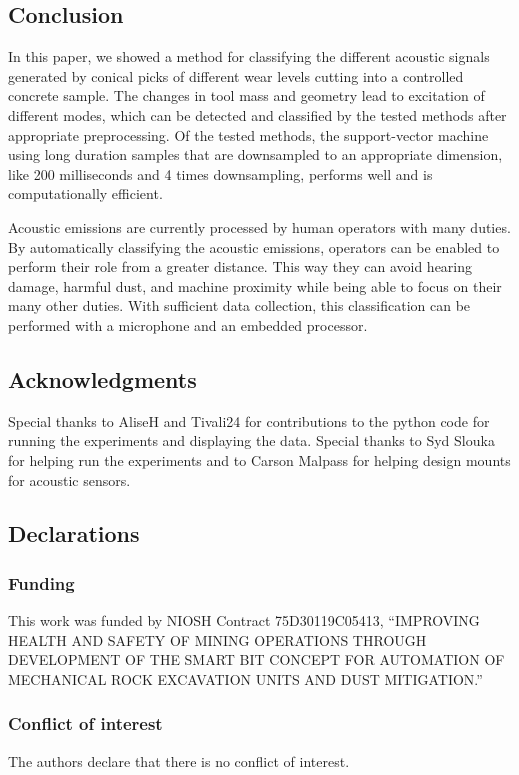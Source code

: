 \subsection{Conclusion}\label{sec13}

In this paper, we showed a method for classifying the different acoustic signals
generated by conical picks of different wear levels cutting into a controlled concrete sample. 
The changes in tool mass and geometry lead to excitation of different modes,
which can be detected and classified by the tested methods after 
appropriate preprocessing. Of the tested methods,
the support-vector machine using long duration samples that are downsampled to an appropriate dimension, 
like 200 milliseconds and 4 times downsampling,
performs well and is computationally efficient.

Acoustic emissions are currently processed by human operators with many duties. 
By automatically classifying the acoustic emissions, operators
can be enabled to perform their role from a greater distance.
This way they can avoid hearing damage, harmful dust, and machine proximity
while being able to focus on their many other duties.
With sufficient data collection, 
this classification can be performed with a microphone and an embedded processor.


\subsection*{Acknowledgments}

Special thanks to AliseH and Tivali24 for contributions to the python code for running the experiments
and displaying the data. Special thanks to Syd Slouka for helping run the experiments 
and to Carson Malpass for helping design mounts for acoustic sensors. 

\subsection*{Declarations}

\subsubsection*{Funding}
This work was funded by NIOSH Contract
75D30119C05413, “IMPROVING HEALTH AND SAFETY OF
MINING OPERATIONS THROUGH DEVELOPMENT OF THE
SMART BIT CONCEPT FOR AUTOMATION OF MECHANICAL
ROCK EXCAVATION UNITS AND DUST MITIGATION.”

\subsubsection*{Conflict of interest}
The authors declare that there is no conflict of interest.


